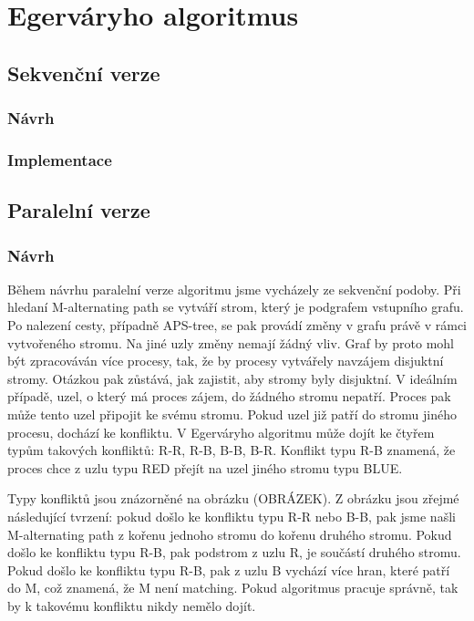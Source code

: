 \documentclass[a4paper, 11pt, titlepage, final]{article}[3. prosinec 2011]
\begin{document}
\section{Egerváryho algoritmus}

\subsection{Sekvenční verze}

\subsubsection*{Návrh}

\subsubsection*{Implementace}

\subsection{Paralelní verze}

\subsubsection*{Návrh}

Během návrhu paralelní verze algoritmu jsme vycházely ze sekvenční podoby. Při hledaní M-alternating path se vytváří strom, který je podgrafem vstupního grafu. Po nalezení cesty, případně APS-tree, se pak provádí změny v grafu právě v rámci vytvořeného stromu. Na jiné uzly změny nemají žádný vliv. Graf by proto mohl být zpracováván více procesy, tak, že by procesy vytvářely navzájem disjuktní stromy. Otázkou pak zůstává, jak zajistit, aby stromy byly disjuktní. V ideálním případě, uzel, o který má proces zájem, do žádného stromu nepatří. Proces pak může tento uzel připojit ke svému stromu. Pokud uzel již patří do stromu jiného procesu, dochází ke konfliktu. V Egerváryho algoritmu může dojít ke čtyřem typům takových konfliktů: R-R, R-B, B-B, B-R. Konflikt typu R-B znamená, že proces chce z uzlu typu RED přejít na uzel jiného stromu typu BLUE. 

Typy konfliktů jsou znázorněné na obrázku (OBRÁZEK). Z obrázku jsou zřejmé následující tvrzení: pokud došlo ke konfliktu typu R-R nebo B-B, pak jsme našli M-alternating path z kořenu jednoho stromu do kořenu druhého stromu. Pokud došlo ke konfliktu typu R-B, pak podstrom z uzlu R, je součástí druhého stromu. Pokud došlo ke konfliktu typu R-B, pak z uzlu B vychází více hran, které patří do M, což znamená, že M není matching. Pokud algoritmus pracuje správně, tak by k takovému konfliktu nikdy nemělo dojít. 
\end{document}
